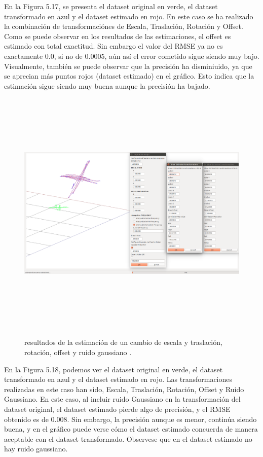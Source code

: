 En la Figura 5.17, se presenta el dataset original en verde, el dataset transformado en azul y el dataset estimado en rojo.
En este caso se ha realizado la combinación de transformaciónes de Escala, Traslación, Rotación y Offset.
Como se puede observar en los resultados de las estimaciones, el offset es estimado con total exactitud. Sin embargo el valor del RMSE ya no es exactamente 0.0, si no de 0.0005, aún así el error cometido sigue siendo muy bajo.
Visualmente, también se puede observar que la precisión ha disminiuido, ya que se aprecian más puntos rojos (dataset estimado) en el gráfico. Esto indica que la estimación sigue siendo muy buena aunque la precisión ha bajado.


\begin{figure}[h]
\begin{center}
\label{fig:opciones de View}\includegraphics[height=12.0cm,width=18.0cm]{img/cap6/Escala_Trasla_Rota_Offset_GaussNoise_abba.png}
\hspace{0.5cm}

\end{center}

\caption{ resultados de la estimación de un cambio de escala y traslación, rotación, offset y ruido gaussiano .}
\end{figure}

En la Figura 5.18, podemos ver el dataset original en verde, el dataset transformado en azul y el dataset estimado en rojo.
Las transformaciones realizadas en este caso han sido, Escala, Traslación, Rotación, Offset y Ruido Gaussiano.
En este caso, al incluir ruido Gaussiano en la transformación del dataset original, el dataset estimado pierde algo de precisión, y el RMSE obtenido es de  0.008.
Sin embargo, la precisión aunque es menor, continúa siendo buena, y en el gráfico puede verse cómo el dataset estimado concuerda de manera aceptable con el dataset transformado. Observese que en el dataset estimado no hay ruido gaussiano.

